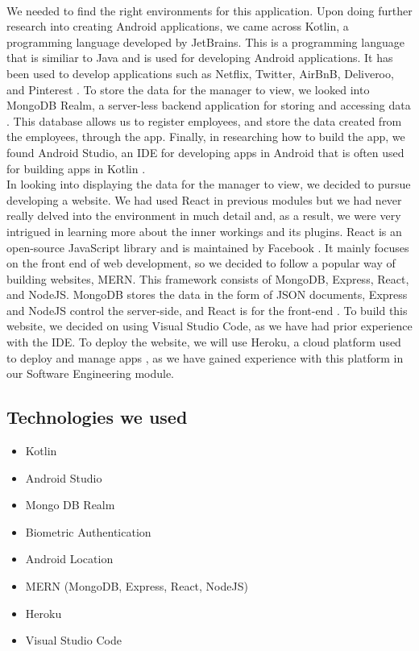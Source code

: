 \\
We needed to find the right environments for this application. Upon doing further research into creating Android applications, we came across Kotlin, a programming language developed by JetBrains. This is a programming language that is similiar to Java and is used for developing Android applications. It has been used to develop applications such as Netflix, Twitter, AirBnB, Deliveroo, and Pinterest \cite{kotlin}. To store the data for the manager to view, we looked into MongoDB Realm, a server-less backend application for storing and accessing data \cite{realm}. This database allows us to register employees, and store the data created from the employees, through the app. Finally, in researching how to build the app, we found Android Studio, an IDE for developing apps in Android that is often used for building apps in Kotlin \cite{androidStudio}.
\\
In looking into displaying the data for the manager to view, we decided to pursue developing a website. We had used React in previous modules but we had never really delved into the environment in much detail and, as a result, we were very intrigued in learning more about the inner workings and its plugins. React is an open-source JavaScript library and is maintained by Facebook \cite{react}. It mainly focuses on the front end of web development, so we decided to follow a popular way of building websites, MERN. This framework consists of MongoDB, Express, React, and NodeJS. MongoDB stores the data in the form of JSON documents, Express and NodeJS control the server-side, and React is for the front-end \cite{mern}. To build this website, we decided on using Visual Studio Code, as we have had prior experience with the IDE. To deploy the website, we will use Heroku, a cloud platform used to deploy and manage apps \cite{heroku}, as we have gained experience with this platform in our Software Engineering module.
\\
\subsection{Technologies we used}
\begin{itemize}
  \item Kotlin
  \item Android Studio
  \item Mongo DB Realm
  \item Biometric Authentication
  \item Android Location
  \item MERN (MongoDB, Express, React, NodeJS)
  \item Heroku
  \item Visual Studio Code
\end{itemize}


